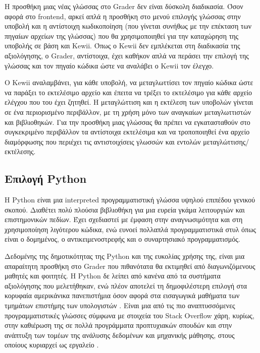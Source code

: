 \documentclass[diploma]{softlab-thesis}
\begin{document}
\bigskip

Η προσθήκη μιας νέας γλώσσας στο Grader δεν είναι δύσκολη διαδικασία.
Όσον αφορά στο frontend, αρκεί απλά η προσθήκη στο μενού επιλογής γλώσσας
στην υποβολή και η αντίστοιχη κωδικοποίηση (που γίνεται συνήθως με την επέκταση
των πηγαίων αρχείων της γλώσσας) που θα χρησιμοποιηθεί για την καταχώρηση της
υποβολής σε βάση και Kewii. Όπως ο Kewii δεν εμπλέκεται στη διαδικασία της
αξιολόγησης, ο Grader, αντίστοιχα, έχει καθήκον απλά να περάσει την επιλογή
της γλώσσας και τον πηγαίο κώδικα ώστε να αναλάβει ο Kewii τον έλεγχο.

\bigskip

Ο Kewii αναλαμβάνει, για κάθε υποβολή, να μεταγλωττίσει τον πηγαίο κώδικα ώστε
να παράξει το εκτελέσιμο αρχείο και έπειτα να τρέξει το εκτελέσιμο για κάθε
αρχείο ελέγχου που του έχει ζητηθεί. Η μεταγλώττιση και η εκτέλεση των υποβολών
γίνεται σε ένα περιορισμένο περιβάλλον, με τη χρήση μόνο των αναγκαίων
μεταγλωττιστών και βιβλιοθηκών. Για την προσθήκη μιας γλώσσας θα πρέπει να
εγκατασταθούν στο συγκεκριμένο περιβάλλον τα αντίστοιχα εκτελέσιμα και να
τροποποιηθεί ένα αρχείο διαμόρφωσης που περιέχει τις αντιστοιχίσεις γλωσσών
και εντολών μεταγλώττισης/εκτέλεσης.

\subsection{Επιλογή Python}

Η Python είναι μια interpreted προγραμματιστική γλώσσα υψηλού επιπέδου
γενικού σκοπού. Διαθέτει πολύ πλούσια βιβλιοθήκη για μια ευρεία γκάμα
λειτουργιών και επιστημονικών πεδίων. Έχει σχεδιαστεί με έμφαση στην
αναγνωσιμότητα και στη χρησιμοποίηση λιγότερου κώδικα, ενώ ευνοεί πολλαπλά
προγραμματιστικά στυλ όπως είναι ο δομημένος, ο αντικειμενοστρεφής και ο συναρτησιακό προγραμματισμός.

\bigskip

Δεδομένης της δημοτικότητας της Python και της ευκολίας χρήσης της, είναι μια
απαραίτητη προσθήκη στο Grader που πιθανότατα θα εκτιμηθεί από διαγωνιζόμενους
μαθητές και φοιτητές. Η Python δε λείπει από κανένα από τα συστήματα
αξιολόγησης που μελετήθηκαν, ενώ πλέον αποτελεί τη δημοφιλέστερη επιλογή στα
κορυφαία αμερικάνικα πανεπιστήμια όσον αφορά στα εισαγωγικά μαθήματα των
τμημάτων επιστήμης των υπολογιστών \cite{website:popularpython}.  Είναι μια από
τις πιο αναπτυσσόμενες προγραμματιστικές γλώσσες σύμφωνα με στοιχεία του Stack
Overflow \cite{website:pythongrowth} χάρη, κυρίως, στην καθιέρωση της σε πολλά
προγράμματα προπτυχιακών σπουδών και στην ανάπτυξη των τομέων της ανάλυσης
δεδομένων και μηχανικής μάθησης, στους οποίους κυριαρχεί ως εργαλείο
\cite{website:whypython}.
\end{document}
